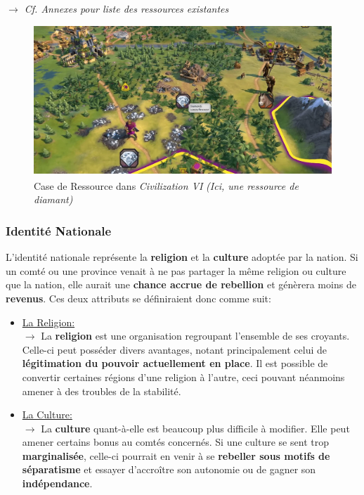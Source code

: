 \documentclass{article}
\def\reg{\small{\textsuperscript{\textregistered}}}
\begin{document}
                \textit{$\rightarrow$ Cf. Annexes pour liste des ressources existantes}
            
                \begin{figure}[h]
                    \centering
                        \includegraphics[scale=0.2]{image_civ6_ressource.png}
                        \caption{Case de Ressource dans \textit{Civilization VI\reg} \textit{(Ici, une ressource de diamant)}}
                        \label{fig:x photosysteme}
                \end{figure}

            
            \subsubsection{Identité Nationale}
                L'identité nationale représente la \textbf{religion} et la \textbf{culture} adoptée par la nation. Si un comté ou une province venait à ne pas partager la même religion ou culture que la nation, elle aurait une \textbf{chance accrue de rebellion} et génèrera moins de \textbf{revenus}. Ces deux attributs se définiraient donc comme suit:
                    \begin{itemize}
                        \item \underline{La Religion: } \\
                            $\rightarrow$ La \textbf{religion} est une organisation regroupant l'ensemble de ses croyants. Celle-ci peut posséder divers avantages, notant principalement celui de \textbf{légitimation du pouvoir actuellement en place}. Il est possible de convertir certaines régions d'une religion à l'autre, ceci pouvant néanmoins amener à des troubles de la stabilité.\\
                        \item \underline{La Culture: } \\
                            $\rightarrow$ La \textbf{culture} quant-à-elle est beaucoup plus difficile à modifier. Elle peut amener certains bonus au comtés concernés. Si une culture se sent trop \textbf{marginalisée}, celle-ci pourrait en venir à se \textbf{rebeller sous motifs de séparatisme} et essayer d'accroître son autonomie ou de gagner son \textbf{indépendance}. \\
                    \end{itemize}
                    
\end{document}
